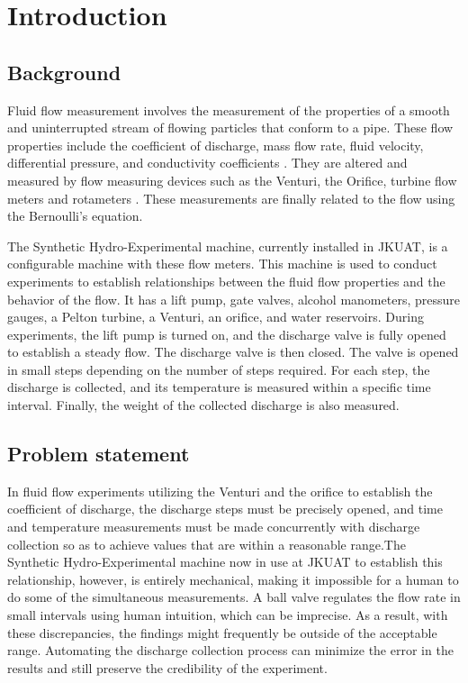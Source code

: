 \section{Introduction}
\label{sec:introduction}
\subsection{Background}
Fluid flow measurement involves the measurement of the properties of a smooth and uninterrupted stream of flowing particles that conform to a pipe. These flow properties include the coefficient of discharge, mass flow rate, fluid velocity, differential pressure, and conductivity coefficients \cite{pereira2009flow}. They are altered and measured by flow measuring devices such as the Venturi, the Orifice, turbine flow meters and rotameters \cite{nandagopal2022fluid}. These measurements are finally related to the flow using the Bernoulli's equation. 

\par
The Synthetic Hydro-Experimental machine, currently installed in JKUAT, is a configurable machine with these flow meters. This machine is used to conduct experiments to establish relationships between the fluid flow properties and the behavior of the flow. It has a lift pump, gate valves, alcohol manometers, pressure gauges, a Pelton turbine, a Venturi, an orifice, and water reservoirs.  During experiments, the lift pump is turned on, and the discharge valve is fully opened to establish a steady flow.  The discharge valve is then closed. The valve is opened in small steps depending on the number of steps required. For each step, the discharge is collected, and its temperature is measured within a specific time interval. Finally, the weight of the collected discharge is also measured.

\subsection{Problem statement}

In fluid flow experiments utilizing the Venturi and the orifice to establish the coefficient of discharge, the discharge steps must be precisely opened, and time and temperature measurements must be made concurrently with discharge collection so as to achieve values that are within a reasonable range.The Synthetic Hydro-Experimental machine now in use at JKUAT to establish this relationship, however, is entirely mechanical, making it impossible for a human to do some of the simultaneous measurements. A ball valve regulates the flow rate in small intervals using human intuition, which can be imprecise. As a result, with these discrepancies, the findings might frequently be outside of the acceptable range. Automating the discharge collection process can minimize the error in the results and still preserve the credibility of the experiment.

